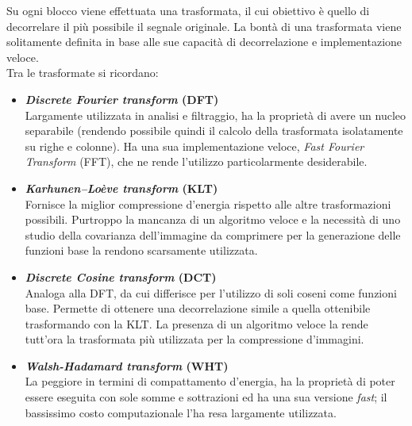 Su ogni blocco viene effettuata una trasformata, 
il cui obiettivo è quello di decorrelare il più possibile il segnale originale.
La bontà di una trasformata viene solitamente definita in base alle sue 
capacità di decorrelazione e implementazione veloce.\\

Tra le trasformate si ricordano:

\begin{itemize}
  
  \item \textbf{\emph{Discrete Fourier transform} (DFT)}\\
    Largamente utilizzata in analisi e filtraggio, ha la proprietà di avere un 
    nucleo separabile (rendendo possibile quindi il calcolo della trasformata 
    isolatamente su righe e colonne). Ha una sua implementazione veloce, 
    \emph{Fast Fourier Transform} (FFT), che ne rende l'utilizzo 
    particolarmente 
    desiderabile.
    
  \item \textbf{\emph{Karhunen–Loève transform} (KLT)}\\
    Fornisce la miglior compressione d'energia rispetto alle altre 
    trasformazioni possibili. Purtroppo la mancanza di un algoritmo veloce e la 
    necessità di uno studio della covarianza dell'immagine da comprimere per la 
    generazione delle funzioni base la rendono scarsamente utilizzata.
    
  \item \textbf{\emph{Discrete Cosine transform} (DCT)}\\
    Analoga alla DFT, da cui differisce per l'utilizzo di soli coseni come 
    funzioni base.
    Permette di ottenere una decorrelazione simile a quella ottenibile %
    trasformando con la KLT. La presenza di un algoritmo veloce la rende 
    tutt'ora la trasformata più utilizzata per la compressione d'immagini.
   
  \item \textbf{\emph{Walsh-Hadamard transform} (WHT)}\\
    La peggiore in termini di compattamento d'energia, ha la proprietà di poter 
    essere eseguita con sole somme e sottrazioni ed ha una sua versione 
    \emph{fast}; il bassissimo costo computazionale l'ha resa largamente 
    utilizzata.
    
\end{itemize}


